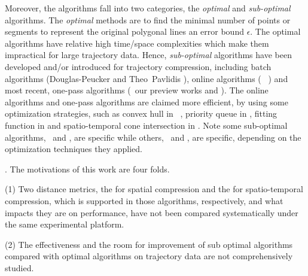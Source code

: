 Moreover, the \lsa algorithms fall into two categories, \ie the \textit{optimal} and \textit{sub-optimal} algorithms. 
The \textit{optimal} methods\cite{Imai:Optimal,Chan:Optimal} are to find the minimal number of points or segments to represent the original polygonal lines \wrt an error bound $\epsilon$.
%
The optimal \lsa algorithms have relative high time/space complexities which make them impractical for large trajectory data.
Hence, \textit{sub-optimal} \lsa algorithms have been developed and/or introduced for trajectory compression, including batch algorithms (\eg Douglas-Peucker \cite{Douglas:Peucker, Meratnia:Spatiotemporal} and Theo~Pavlidis \cite{Pavlidis:Segment}), online algorithms (\eg~\bqsa\cite{Liu:BQS} \squishe \cite{Muckell:Compression}) and most recent, one-pass algorithms (\eg~our preview works \operb \cite{Lin:Operb} and \cised \cite{Lin:Cised}). The online algorithms and one-pass algorithms are claimed more efficient, by using some optimization strategies, such as convex hull in \bqsa~\cite{Liu:BQS}, priority queue in \squishe \cite{Muckell:Compression}, {fitting function} in \operb \cite {Lin:Operb} and spatio-temporal cone intersection in \cised \cite {Lin:Cised}. Note some sub-optimal algorithms, \eg ~\bqsa and \operb, are \ped specific while others, \eg~\squishe and \cised, are \sed specific, depending on the optimization techniques they applied.

. The motivations of this work are four folds.

\ni (1) Two distance metrics, \ie the \ped for spatial compression and the \sed \cite{Meratnia:Spatiotemporal} for spatio-temporal compression, which is supported in those algorithms, respectively, and what impacts they are on performance, have not been compared systematically under the same experimental platform. 

\ni (2) The effectiveness and the room for improvement of sub optimal \lsa algorithms compared with optimal \lsa algorithms on trajectory data are not comprehensively studied.

